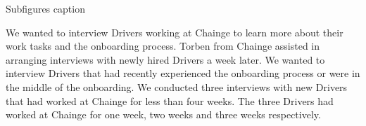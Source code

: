 \begin{pandoccrossrefsubfigures}
\hfill
{}\hfill
{}

\caption[{Subfigures caption}]{Subfigures caption}

\label{fig:chainge_headquarters}

\end{pandoccrossrefsubfigures}

We wanted to interview Drivers working at Chainge to learn more about
their work tasks and the onboarding process. Torben from Chainge
assisted in arranging interviews with newly hired Drivers a week later.
We wanted to interview Drivers that had recently experienced the
onboarding process or were in the middle of the onboarding. We conducted
three interviews with new Drivers that had worked at Chainge for less
than four weeks. The three Drivers had worked at Chainge for one week,
two weeks and three weeks respectively.

